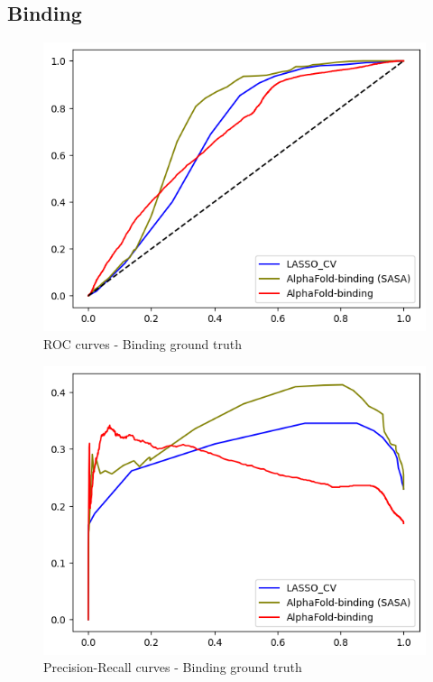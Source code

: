 \pagebreak

\subsection{Binding}

\begin{figure}[h!]
    \centering
    \includegraphics[scale = 0.8]{res/ML/roc-binding.png}
    \caption{ROC curves - Binding ground truth}
\end{figure}

\begin{figure}[h!]
    \centering
    \includegraphics[scale = 0.8]{res/ML/precisionrecall-binding.png}
    \caption{Precision-Recall curves - Binding ground truth}
\end{figure}

